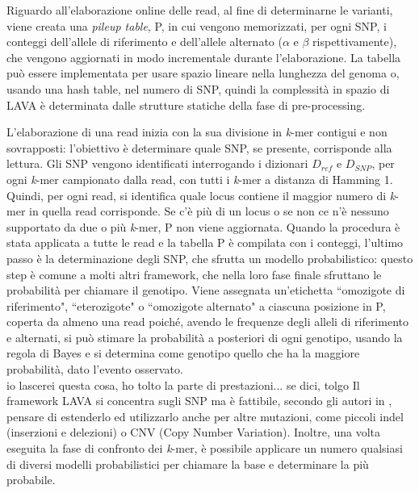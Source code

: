 \documentclass[../main.tex]{subfiles}
\begin{document}
\noindent
Riguardo all'elaborazione online delle read, al fine di determinarne le varianti, viene creata una \textit{pileup table}, P, in cui vengono memorizzati, per ogni SNP, i conteggi dell'allele di riferimento e dell'allele alternato ($\alpha$ e $\beta$ rispettivamente), che vengono aggiornati in modo incrementale durante l'elaborazione. La tabella può essere implementata per usare spazio lineare nella lunghezza del genoma o, usando una hash table, nel numero di SNP, quindi la complessità in spazio di LAVA è determinata dalle strutture statiche della fase di pre-processing.

L'elaborazione di una read inizia con la sua divisione in \textit{k}-mer contigui e non sovrapposti: l'obiettivo è determinare quale SNP, se presente, corrisponde alla lettura. Gli SNP vengono identificati interrogando i dizionari $D_{ref}$ e $D_{SNP}$, per ogni \textit{k}-mer campionato dalla read, con tutti i \textit{k}-mer a distanza di Hamming 1. Quindi, per ogni read, si identifica quale locus contiene il maggior numero di \textit{k}-mer in quella read corrisponde. Se c'è più di un locus o se non ce n'è nessuno supportato da due o più \textit{k}-mer, P non viene aggiornata. Quando la procedura è stata applicata a tutte le read e la tabella P è compilata con i conteggi, l'ultimo passo è la determinazione degli SNP, che sfrutta un modello probabilistico: questo step è comune a molti altri framework, che nella loro fase finale sfruttano le probabilità per chiamare il genotipo. Viene assegnata un'etichetta ``omozigote di riferimento", ``eterozigote" o ``omozigote alternato" a ciascuna posizione in P, coperta da almeno una read poiché, avendo le frequenze degli alleli di riferimento e alternati, si può stimare la probabilità a posteriori di ogni genotipo, usando la regola di Bayes e si determina come genotipo quello che ha la maggiore probabilità, dato l'evento osservato. \\

\textcolor{OliveGreen}{io lascerei questa cosa, ho tolto la parte di prestazioni... se dici, tolgo}
\noindent
\textcolor{BurntOrange}{Il framework LAVA si concentra sugli SNP ma è fattibile, secondo gli autori in  \cite{shajii2016lava}, pensare di estenderlo ed utilizzarlo anche per altre mutazioni, come piccoli indel (inserzioni e delezioni) o CNV (Copy Number Variation). Inoltre, una volta eseguita la fase di confronto dei \textit{k}-mer, è possibile applicare un numero qualsiasi di diversi modelli probabilistici per chiamare la base e determinare la più probabile. }
\end{document}
